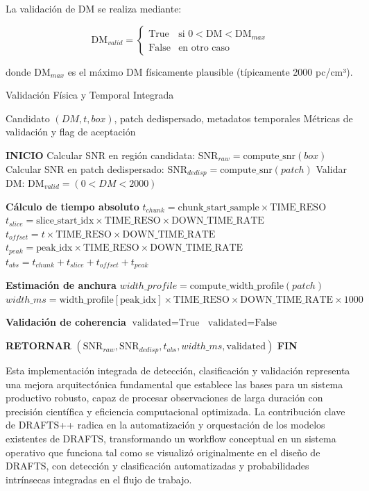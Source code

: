 La validación de DM se realiza mediante:

\[
\text{DM}_{valid} = \begin{cases} 
\text{True} & \text{si } 0 < \text{DM} < \text{DM}_{max} \\
\text{False} & \text{en otro caso}
\end{cases}
\]

donde $\text{DM}_{max}$ es el máximo DM físicamente plausible (típicamente 2000 pc/cm³).

\begin{algorithm}[H]
\caption{Validación Física y Temporal Integrada}
\label{alg:physical-temporal-validation}
\begin{algorithmic}[1]
\Require Candidato $(DM, t, box)$, patch dedispersado, metadatos temporales
\Ensure Métricas de validación y flag de aceptación

\State \textbf{INICIO}
\State Calcular SNR en región candidata: $\text{SNR}_{raw} = \text{compute\_snr}(box)$
\State Calcular SNR en patch dedispersado: $\text{SNR}_{dedisp} = \text{compute\_snr}(patch)$
\State Validar DM: $\text{DM}_{valid} = (0 < DM < 2000)$

\State \textbf{Cálculo de tiempo absoluto}
\State $t_{chunk} = \text{chunk\_start\_sample} \times \text{TIME\_RESO}$
\State $t_{slice} = \text{slice\_start\_idx} \times \text{TIME\_RESO} \times \text{DOWN\_TIME\_RATE}$
\State $t_{offset} = t \times \text{TIME\_RESO} \times \text{DOWN\_TIME\_RATE}$
\State $t_{peak} = \text{peak\_idx} \times \text{TIME\_RESO} \times \text{DOWN\_TIME\_RATE}$
\State $t_{abs} = t_{chunk} + t_{slice} + t_{offset} + t_{peak}$

\State \textbf{Estimación de anchura}
\State $width\_profile = \text{compute\_width\_profile}(patch)$
\State $width\_ms = \text{width\_profile}[\text{peak\_idx}] \times \text{TIME\_RESO} \times \text{DOWN\_TIME\_RATE} \times 1000$

\State \textbf{Validación de coherencia}
    \State $\text{validated} = \text{True}$
\Else
    \State $\text{validated} = \text{False}$
\EndIf

\State \textbf{RETORNAR} $(\text{SNR}_{raw}, \text{SNR}_{dedisp}, t_{abs}, width\_ms, \text{validated})$
\State \textbf{FIN}
\end{algorithmic}
\end{algorithm}

Esta implementación integrada de detección, clasificación y validación representa una mejora arquitectónica fundamental que establece las bases para un sistema productivo robusto, capaz de procesar observaciones de larga duración con precisión científica y eficiencia computacional optimizada. La contribución clave de DRAFTS++ radica en la automatización y orquestación de los modelos existentes de DRAFTS, transformando un workflow conceptual en un sistema operativo que funciona tal como se visualizó originalmente en el diseño de DRAFTS, con detección y clasificación automatizadas y probabilidades intrínsecas integradas en el flujo de trabajo.


